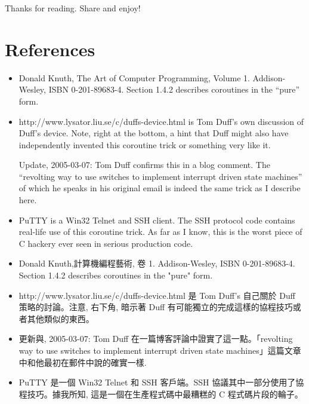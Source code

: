 \documentclass[12pt]{article}
\begin{document}
\begin{CJK}{UTF8}{bsmi}
Thanks for reading. Share and enjoy!

\section{References}

\begin{itemize}
\item Donald Knuth, The Art of Computer Programming, Volume 1. Addison-Wesley, ISBN 0-201-89683-4. Section 1.4.2 describes coroutines in the ``pure'' form.

\item http://www.lysator.liu.se/c/duffs-device.html is Tom Duff's own discussion of Duff's device. Note, right at the bottom, a hint that Duff might also have independently invented this coroutine trick or something very like it.


Update, 2005-03-07: Tom Duff confirms this in a blog comment. The ``revolting way to use switches to implement interrupt driven state machines'' of which he speaks in his original email is indeed the same trick as I describe here.

\item PuTTY is a Win32 Telnet and SSH client. The SSH protocol code contains real-life use of this coroutine trick. As far as I know, this is the worst piece of C hackery ever seen in serious production code. 

\end{itemize}


\begin{itemize}
\item    Donald Knuth,計算機編程藝術, 卷 1. Addison-Wesley, ISBN 0-201-89683-4. Section 1.4.2 describes coroutines in the "pure" form.
\item        http://www.lysator.liu.se/c/duffs-device.html 是 Tom Duff's 自己關於 Duff 策略的討論。注意, 右下角, 暗示著 Duff 有可能獨立的完成這樣的協程技巧或者其他類似的東西。

\item            更新與, 2005-03-07: Tom Duff 在一篇博客評論中證實了這一點。「revolting way to use switches to implement interrupt driven state machines」這篇文章中和他最初在郵件中說的確實一樣.
\item                PuTTY 是一個 Win32 Telnet 和 SSH 客戶端。SSH 協議其中一部分使用了協程技巧。據我所知, 這是一個在生產程式碼中最糟糕的
C 程式碼片段的輪子。
\end{itemize}





\end{CJK}
\end{document}
